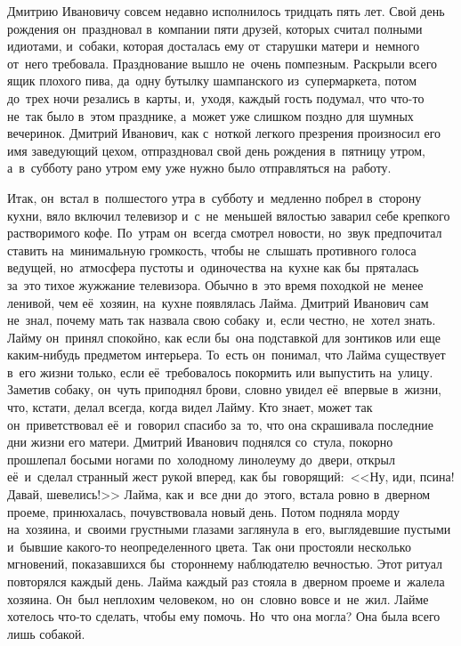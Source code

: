 \clearpage
\chaps{***} 
\lettrine[lines=3, loversize=0.1]{Д}{}митрию Ивановичу совсем недавно исполнилось тридцать пять лет.
Свой день рождения он~праздновал в~компании пяти друзей, которых считал полными идиотами, и~собаки, которая досталась ему от~старушки матери и~немного от~него требовала.
Празднование вышло не~очень помпезным.
Раскрыли всего ящик плохого пива, да~одну бутылку шампанского из~супермаркета, потом до~трех ночи резались в~карты, и,~уходя, каждый гость подумал, что что-то не~так было в~этом празднике, а~может уже слишком поздно для шумных вечеринок.
Дмитрий Иванович, как с~ноткой легкого презрения произносил его имя заведующий цехом, отпраздновал свой день рождения в~пятницу утром, а~в~субботу рано утром ему уже нужно было отправляться на~работу.

Итак, он~встал в~полшестого утра в~субботу и~медленно побрел в~сторону кухни, вяло включил телевизор и~с~не~меньшей вялостью заварил себе крепкого растворимого кофе.
По~утрам он~всегда смотрел новости, но~звук предпочитал ставить на~минимальную громкость, чтобы не~слышать противного голоса ведущей, но~атмосфера пустоты и~одиночества на~кухне как бы~пряталась за~это тихое жужжание телевизора.
Обычно в~это время походкой не~менее ленивой, чем её~хозяин, на~кухне появлялась Лайма.
Дмитрий Иванович сам не~знал, почему мать так назвала свою собаку~и, если честно, не~хотел знать.
Лайму он~принял спокойно, как если бы~она подставкой для зонтиков или еще каким-нибудь предметом интерьера.
То~есть он~понимал, что Лайма существует в~его жизни только, если её~требовалось покормить или выпустить на~улицу.
Заметив собаку, он~чуть приподнял брови, словно увидел её~впервые в~жизни, что, кстати, делал всегда, когда видел Лайму.
Кто знает, может так он~приветствовал её~и~говорил спасибо за~то, что она скрашивала последние дни жизни его матери.
Дмитрий Иванович поднялся со~стула, покорно прошлепал босыми ногами по~холодному линолеуму до~двери, открыл её~и~сделал странный жест рукой вперед, как бы~говорящий:~<<Ну, иди, псина! Давай, шевелись!>>
Лайма, как и~все дни до~этого, встала ровно в~дверном проеме, принюхалась, почувствовала новый день.
Потом подняла морду на~хозяина, и~своими грустными глазами заглянула в~его, выглядевшие пустыми и~бывшие какого-то неопределенного цвета.
Так они простояли несколько мгновений, показавшихся бы~стороннему наблюдателю вечностью.
Этот ритуал повторялся каждый день.
Лайма каждый раз стояла в~дверном проеме и~жалела хозяина.
Он~был неплохим человеком, но~он~словно вовсе и~не~жил.
Лайме хотелось что-то сделать, чтобы ему помочь.
Но~что она могла? Она была всего лишь собакой.
